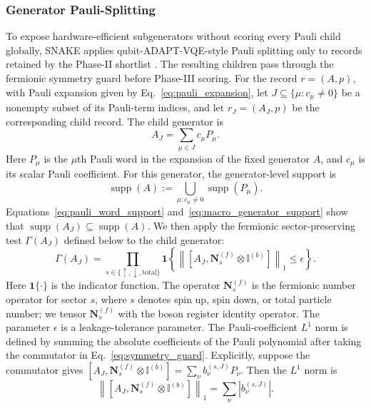 \documentclass[
  reprint,
  amsmath,
  amssymb,
  aps,
  pra,
  nofootinbib,
  superscriptaddress,
  floatfix
]{revtex4-2}
\begin{document}
\subsubsection{Generator Pauli-Splitting}
To expose hardware-efficient subgenerators without scoring every Pauli child
globally, \textsc{SNAKE} applies qubit-ADAPT-VQE-style Pauli splitting only to
records retained by the Phase-II shortlist \cite{Tang2021}. The resulting
children pass through the fermionic symmetry guard before Phase-III scoring.
For the record
\(r=(A,p)\), with Pauli expansion given by Eq.~\eqref{eq:pauli_expansion}, let
\(J\subseteq\{\mu:c_\mu\ne0\}\) be a nonempty subset of its Pauli-term
indices, and let
\(r_J=(A_J,p)\) be the corresponding child record. The child generator is
\begin{equation*}
A_J=\sum_{\mu\in J}c_{\mu}P_{\mu}.
\end{equation*}
Here \(P_{\mu}\) is the \(\mu\)th Pauli word in the expansion of the fixed
generator \(A\), and \(c_{\mu}\) is its scalar Pauli coefficient.
For this generator, the generator-level support is
\begin{equation}
\operatorname{supp}(A)
:=
\bigcup_{\mu:c_{\mu}\ne0}
\operatorname{supp}(P_{\mu}).
\label{eq:macro_generator_support}
\end{equation}
Equations~\eqref{eq:pauli_word_support} and~\eqref{eq:macro_generator_support}
show that
\(\operatorname{supp}(A_J)\subseteq\operatorname{supp}(A)\). We then apply
the fermionic sector-preserving test \(\Gamma(A_J)\) defined below to the
child generator:
\begin{equation}
\Gamma(A_J)
=
\prod_{s\in\{\uparrow,\downarrow,\mathrm{total}\}}
\mathbf 1
\left\{
\left\|
\left[
A_J,\mathbf N_s^{(f)}\otimes \mathbb I^{(b)}
\right]
\right\|_1
\le \epsilon
\right\}.
\label{eq:symmetry_guard}
\end{equation}
Here \(\mathbf 1\{\cdot\}\) is the indicator function. The operator \(\mathbf N_s^{(f)}\) is the fermionic number operator for sector \(s\), where \(s\) denotes spin up, spin
down, or total particle number; we tensor \(\mathbf N_s^{(f)}\) with the boson
register identity operator. The parameter \(\epsilon\) is a leakage-tolerance
parameter. The Pauli-coefficient \(L^1\) norm is defined by summing the absolute
coefficients of the Pauli polynomial after taking the commutator in
Eq.~\eqref{eq:symmetry_guard}. Explicitly, suppose the commutator gives
\([A_J,\mathbf N_s^{(f)}\otimes \mathbb I^{(b)}]
=\sum_\nu b_\nu^{(s,J)}P_\nu\). Then the \(L^1\) norm is
\[
\left\|
\left[
A_J,\mathbf N_s^{(f)}\otimes \mathbb I^{(b)}
\right]
\right\|_1
=
\sum_\nu |b_\nu^{(s,J)}|.
\]
\end{document}
